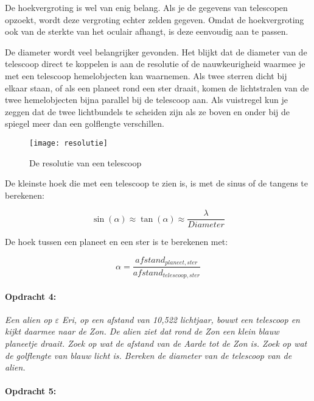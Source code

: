 De hoekvergroting is wel van enig belang. Als je de gegevens van telescopen
opzoekt, wordt deze vergroting echter zelden gegeven. Omdat de hoekvergroting
ook van de sterkte van het oculair afhangt, is deze eenvoudig aan
te passen.

De diameter wordt veel belangrijker gevonden. Het blijkt dat de diameter
van de telescoop direct te koppelen is aan de resolutie of de nauwkeurigheid
waarmee je met een telescoop hemelobjecten kan waarnemen. Als twee
sterren dicht bij elkaar staan, of als een planeet rond een ster draait,
komen de lichtstralen van de twee hemelobjecten bijna parallel bij
de telescoop aan. Als vuistregel kun je zeggen dat de twee lichtbundels
te scheiden zijn als ze boven en onder bij de spiegel meer dan een
golflengte verschillen.

\begin{figure}[H]
\noindent \begin{centering}
\texttt{[image: resolutie]}
\par\end{centering}

\caption{De resolutie van een telescoop}
\end{figure}


De kleinste hoek die met een telescoop te zien is, is met de sinus
of de tangens te berekenen:

\begin{equation}
\sin(\alpha)\approx \tan(\alpha)\approx\frac{\lambda}{Diameter}
\end{equation}


De hoek tussen een planeet en een ster is te berekenen met:

\begin{equation}
\alpha=\frac{afstand_{planeet,ster}}{afstand_{telescoop,ster}}
\end{equation}



\paragraph*{Opdracht 4:}

\emph{Een alien op $\varepsilon$ Eri, op een afstand van 10,522 lichtjaar,
bouwt een telescoop en kijkt daarmee naar de Zon. De alien ziet dat
rond de Zon een klein blauw planeetje draait. Zoek op wat de afstand
van de Aarde tot de Zon is. Zoek op wat de golflengte van blauw licht
is. Bereken de diameter van de telescoop van de alien.}


\paragraph*{Opdracht 5:}

